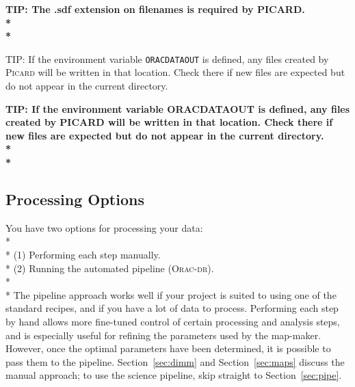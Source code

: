 \documentclass[twoside,11pt]{article}
\newcommand{\htmlref}[2]{#1}
\newenvironment{latexonly}{}{}
\newcommand{\latexhtml}[2]{#1}
\newcommand{\xlabel}[1]{}
\renewcommand{\_}{\texttt{\symbol{95}}}
\newenvironment{fmpage}[1]{\begin{lrbox}{\fmbox}\begin{minipage}{#1}}{\end{minipage}\end{lrbox}\fbox{\usebox{\fmbox}}}
\newcommand{\param}[1]{\texttt{#1}}
\newcommand{\cref}[3]{\latexhtml{#1~\ref{#2}}{\htmlref{#3}{#2}}}
\begin{document}
\begin{htmlonly}
\textbf{TIP: The .sdf extension on filenames is required by PICARD.\\*\\*}
\end{htmlonly}


\begin{latexonly}
\begin{center}
\begin{fmpage}{0.95\linewidth}
\vspace{0.1cm}
TIP: If the environment variable \param{ORAC\_DATA\_OUT} is defined, any files
created by \textsc{Picard} will be written in that location. Check there if new
files are expected but do not appear in the current directory.
\end{fmpage}
\end{center}
\end{latexonly}

\begin{htmlonly}
\textbf{TIP: If the environment variable ORAC\_DATA\_OUT is defined,
any files created by PICARD will be written in that location. Check
there if new files are expected but do not appear in the current
directory.\\*\\*}
\end{htmlonly}

\subsection{\xlabel{options}Processing Options}

You have two options for processing your data:
\\*\\*
(1) Performing each step manually.\\*
(2) Running the automated pipeline (\textsc{Orac-dr}).
\\*\\*
The pipeline approach works well if your project is suited to using one of the
standard recipes, and if you have a lot of data to process. Performing
each step by hand allows more fine-tuned control of certain
processing and analysis steps, and is especially useful for refining
the parameters used by the map-maker. However, once the optimal
parameters have been determined, it is possible to pass them to the
pipeline. \cref{Section}{sec:dimm}{The map-maker explained}
and \cref{Section}{sec:maps}{Reducing your data} discuss the manual approach;
to use the science pipeline, skip
straight to \cref{Section}{sec:pipe}{SCUBA-2 Pipeline}.
\end{document}
